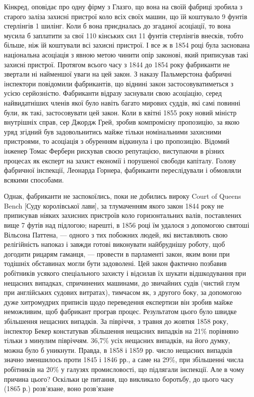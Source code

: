 Кінкред, оповідає про одну фірму з Глазго, що вона на своїй
фабриці зробила з старого заліза захисні пристрої коло всіх
своїх машин, що їй коштувало 9 фунтів стерлінгів 1 шилінг.
Коли б вона приєдналась до згаданої асоціації, то вона мусила б
заплатити за свої 110 кінських сил 11 фунтів стерлінгів внесків,
тобто більше, ніж їй коштували всі захисні пристрої. І все ж
в 1854 році була заснована національна асоціація з явною метою
чинити опір законові, який приписував такі захисні пристрої.
Протягом всього часу з 1844 до 1854 року фабриканти не звертали
ні найменшої уваги на цей закон. З наказу Пальмерстона
фабричні інспектори повідомили фабрикантів, що віднині закон
застосовуватиметься з усією серйозністю. Фабриканти відразу
заснували свою асоціацію, серед найвидатніших членів якої було
навіть багато мирових суддів, які самі повинні були, як такі, застосовувати цей закон. Коли в квітні
1855 року новий міністр
внутрішніх справ, сер Джордж Грей, зробив компромісну пропозицію, за якою уряд згідний був
задовольнитись майже тільки
номінальними захисними пристроями, то асоціація з обуренням
відкинула і цю пропозицію. Відомий інженер Томас Ферберн
рискував своєю репутацією, виступаючи в різних процесах як
експерт на захист економії і порушеної свободи капіталу. Голову
фабричної інспекції, Леонарда Горнера, фабриканти переслідували і обмовляли всякими способами.

Однак, фабриканти не заспокоїлись, поки не добились вироку
Court of Queens Bench [Суду королівської лави], за тлумаченням
якого закон 1844 року не приписував ніяких захисних пристроїв коло горизонтальних валів, поставлених
вище 7 футів над
підлогою; нарешті, в 1856 році їм удалося з допомогою святоші
Вільсона Паттена, — одного з тих побожних людей, які виставляють
свою релігійність напоказ і завжди готові виконувати найбруднішу
роботу, щоб догодити рицарям гаманця, — провести в парламенті
закон, яким вони при тодішніх обставинах могли бути задоволені.
Цей закон фактично позбавив робітників усякого спеціального захисту і відсилав їх шукати
відшкодування при нещасних випадках,
спричинених машинами, до звичайних судів (чистий глум при
англійських судових витратах), тимчасом як, з другого боку,
за допомогою дуже хитромудрих приписів щодо переведення
експертизи він зробив майже неможливим, щоб фабрикант програв процес. Результатом цього було швидке
збільшення нещасних випадків. За півріччя, з травня до жовтня 1858 року,
інспектор Бекер констатував збільшення нещасних випадків на
21\% порівняно тільки з минулим півріччям. 36,7\% усіх нещасних
випадків, на його думку, можна було б уникнути. Правда,
в 1858 і 1859 рр. число нещасних випадків значно зменшилось
проти 1845 і 1846 рр., а саме на 29\%, при збільшенні числа робітників на 20\% у галузях
промисловості, що підлягали інспекції.
Але в чому причина цього? Оскільки це питання, що викликало
боротьбу, до цього часу (1865 р.) розв’язане, воно розв’язане
